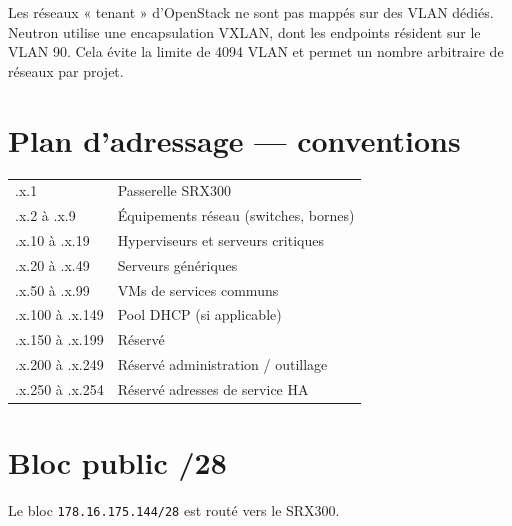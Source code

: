\begin{infobox}
Les réseaux « tenant » d'OpenStack ne sont pas mappés sur des VLAN dédiés. Neutron utilise une encapsulation VXLAN, dont les endpoints résident sur le VLAN 90. Cela évite la limite de 4094 VLAN et permet un nombre arbitraire de réseaux par projet.
\end{infobox}

\section{Plan d'adressage — conventions}
\begin{xltabular}{\textwidth}{@{}lX@{}}
\toprule
{} &  \\
\midrule
\endhead
\bottomrule
\endfoot
\bottomrule
\endlastfoot
.x.1              & Passerelle SRX300 \\
.x.2 à .x.9       & Équipements réseau (switches, bornes) \\
.x.10 à .x.19     & Hyperviseurs et serveurs critiques \\
.x.20 à .x.49     & Serveurs génériques \\
.x.50 à .x.99     & VMs de services communs \\
.x.100 à .x.149   & Pool DHCP (si applicable) \\
.x.150 à .x.199   & Réservé \\
.x.200 à .x.249   & Réservé administration / outillage \\
.x.250 à .x.254   & Réservé adresses de service HA \\

\end{xltabular}

\section{Bloc public /28}
Le bloc \texttt{178.16.175.144/28} est routé vers le SRX300.

